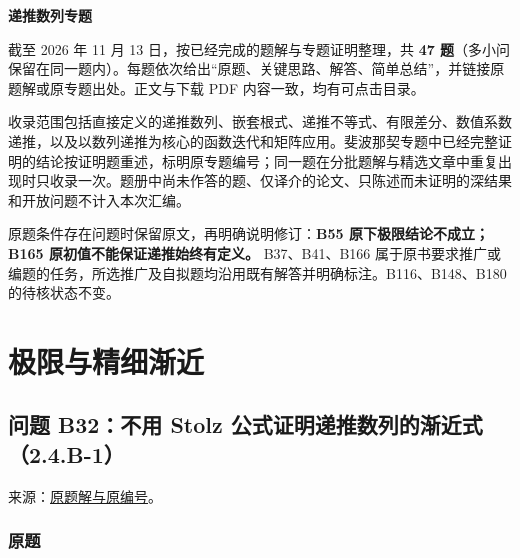 \documentclass[11pt,a4paper]{article}
\begin{document}
\begin{center}
{\LARGE\bfseries 递推数列专题\par}
\vspace{8pt}{\large 已解题目、关键思路与完整解答\par}
\vspace{5pt}{\small 2026年11月13日\quad 共47题\par}
\end{center}
截至 2026 年 11 月 13 日，按已经完成的题解与专题证明整理，共 \textbf{47
题}（多小问保留在同一题内）。每题依次给出``原题、关键思路、解答、简单总结''，并链接原题解或原专题出处。正文与下载
PDF 内容一致，均有可点击目录。

收录范围包括直接定义的递推数列、嵌套根式、递推不等式、有限差分、数值系数递推，以及以数列递推为核心的函数迭代和矩阵应用。斐波那契专题中已经完整证明的结论按证明题重述，标明原专题编号；同一题在分批题解与精选文章中重复出现时只收录一次。题册中尚未作答的题、仅译介的论文、只陈述而未证明的深结果和开放问题不计入本次汇编。

原题条件存在问题时保留原文，再明确说明修订：\textbf{B55
原下极限结论不成立；B165 原初值不能保证递推始终有定义。} B37、B41、B166
属于原书要求推广或编题的任务，所选推广及自拟题均沿用既有解答并明确标注。B116、B148、B180
的待核状态不变。

\clearpage

\label{contents}\tableofcontents\clearpage

\section{极限与精细渐近}\label{ux6781ux9650ux4e0eux7cbeux7ec6ux6e10ux8fd1}

\subsection{问题 B32：不用 Stolz
公式证明递推数列的渐近式（2.4.B-1）}\label{ux95eeux9898-b32ux4e0dux7528-stolz-ux516cux5f0fux8bc1ux660eux9012ux63a8ux6570ux5217ux7684ux6e10ux8fd1ux5f0f2.4.b-1}

来源：\href{https://zj139.github.io/math-notes/problems/e7f87e98efda5bacdd444c79/\#问题-b32}{原题解与原编号}。

\subsubsection{原题}\label{ux539fux9898}
\end{document}
